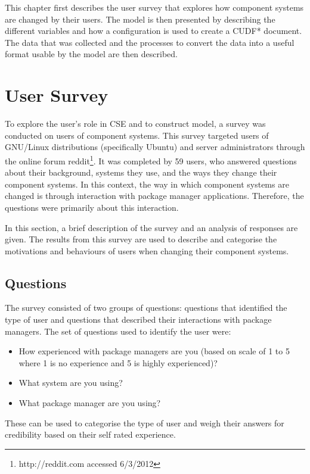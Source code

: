 This chapter first describes the user survey that explores how component systems are changed by their users.
The \usermodel model is then presented by describing the different variables and how a configuration is used to create a CUDF* document.
The data that was collected and the processes to convert the data into a useful format usable by the \usermodel model are then described.

\section{User Survey}
\label{strat.usersurvey}
To explore the user's role in CSE and to construct \usermodel model, a survey was conducted on users of component systems.
This survey targeted users of GNU/Linux distributions (specifically Ubuntu) and server administrators through the online forum reddit\footnote{http://reddit.com accessed 6/3/2012}.
It was completed by 59 users, who answered questions about their background, systems they use, and the ways they change their component systems.
In this context, the way in which component systems are changed is through interaction with package manager applications. 
Therefore, the questions were primarily about this interaction.

In this section, a brief description of the survey and an analysis of responses are given.
The results from this survey are used to describe and categorise the motivations and behaviours of users when changing their component systems.

\subsection{Questions}
The survey consisted of two groups of questions: questions that identified the type of user and questions that described their interactions with package managers.
The set of questions used to identify the user were:
\begin{itemize}
  \item How experienced with package managers are you (based on scale of 1 to 5 where 1 is no experience and 5 is highly experienced)? 
  \item What system are you using?
  \item What package manager are you using?
\end{itemize}
These can be used to categorise the type of user and weigh their answers for credibility based on their self rated experience.

